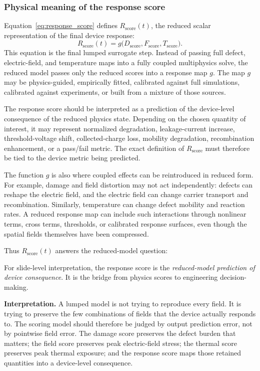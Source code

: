\documentclass[11pt]{article}
\begin{document}
\subsubsection{Physical meaning of the response score}
Equation~\eqref{eq:response_score} defines \(R_{\mathrm{score}}(t)\), the reduced scalar representation of the final device response:
\[
    R_{\mathrm{score}}(t)
    =
    g\!\big(D_{\mathrm{score}},F_{\mathrm{score}},T_{\mathrm{score}}\big).
\]
This equation is the final lumped surrogate step. Instead of passing full defect, electric-field, and temperature maps into a fully coupled multiphysics solve, the reduced model passes only the reduced scores into a response map \(g\). The map \(g\) may be physics-guided, empirically fitted, calibrated against full simulations, calibrated against experiments, or built from a mixture of those sources.

The response score should be interpreted as a prediction of the device-level consequence of the reduced physics state. Depending on the chosen quantity of interest, it may represent normalized degradation, leakage-current increase, threshold-voltage shift, collected-charge loss, mobility degradation, recombination enhancement, or a pass/fail metric. The exact definition of \(R_{\mathrm{score}}\) must therefore be tied to the device metric being predicted.

The function \(g\) is also where coupled effects can be reintroduced in reduced form. For example, damage and field distortion may not act independently: defects can reshape the electric field, and the electric field can change carrier transport and recombination. Similarly, temperature can change defect mobility and reaction rates. A reduced response map can include such interactions through nonlinear terms, cross terms, thresholds, or calibrated response surfaces, even though the spatial fields themselves have been compressed.

Thus \(R_{\mathrm{score}}(t)\) answers the reduced-model question:
\begin{center}
\end{center}
For slide-level interpretation, the response score is the \emph{reduced-model prediction of device consequence}. It is the bridge from physics scores to engineering decision-making.

\begin{physicsbox}
\textbf{Interpretation.} A lumped model is not trying to reproduce every field. It is trying to preserve the few combinations of fields that the device actually responds to. The scoring model should therefore be judged by output prediction error, not by pointwise field error. The damage score preserves the defect burden that matters; the field score preserves peak electric-field stress; the thermal score preserves peak thermal exposure; and the response score maps those retained quantities into a device-level consequence.
\end{physicsbox}
\end{document}
